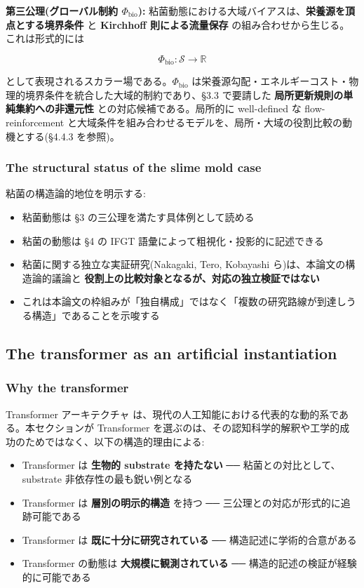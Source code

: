 \textbf{第三公理(グローバル制約 $\Phi_\text{bio}$):}
粘菌動態における大域バイアスは、\textbf{栄養源を頂点とする境界条件} と \textbf{Kirchhoff 則による流量保存} の組み合わせから生じる。これは形式的には

\[
\Phi_\text{bio} : \mathcal{S} \to \mathbb{R}
\]

として表現されるスカラー場である。$\Phi_\text{bio}$ は栄養源勾配・エネルギーコスト・物理的境界条件を統合した大域的制約であり、\S{}3.3 で要請した \textbf{局所更新規則の単純集約への非還元性} との対応候補である。局所的に well-defined な flow-reinforcement と大域条件を組み合わせるモデルを、局所・大域の役割比較の動機とする(\S{}4.4.3 を参照)。

\subsubsection{The structural status of the slime mold case}


粘菌の構造論的地位を明示する:

\begin{itemize}
\item 粘菌動態は \S{}3 の三公理を満たす具体例として読める
\item 粘菌の動態は \S{}4 の IFGT 語彙によって粗視化・投影的に記述できる
\item 粘菌に関する独立な実証研究(Nakagaki, Tero, Kobayashi ら)は、本論文の構造論的議論と \textbf{役割上の比較対象となるが、対応の独立検証ではない}
\item これは本論文の枠組みが「独自構成」ではなく「複数の研究路線が到達しうる構造」であることを示唆する
\end{itemize}

\subsection{The transformer as an artificial instantiation}


\subsubsection{Why the transformer}


Transformer アーキテクチャ \citep{Vaswani2017} は、現代の人工知能における代表的な動的系である。本セクションが Transformer を選ぶのは、その認知科学的解釈や工学的成功のためではなく、以下の構造的理由による:

\begin{itemize}
\item Transformer は \textbf{生物的 substrate を持たない} ── 粘菌との対比として、substrate 非依存性の最も鋭い例となる
\item Transformer は \textbf{層別の明示的構造} を持つ ── 三公理との対応が形式的に追跡可能である
\item Transformer は \textbf{既に十分に研究されている} ── 構造記述に学術的合意がある
\item Transformer の動態は \textbf{大規模に観測されている} ── 構造的記述の検証が経験的に可能である
\end{itemize}

